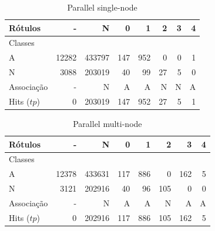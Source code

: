 


\vspace{3ex}

\begin{table}[hbt]%
{\footnotesize
\setlength\tabcolsep{0.35em}
\begin{center}
\caption{Parallel single-node}
\label{tab:single-node-matrix}
\begin{tabular}{l|r|r|r|r|r|r|r}
  Rótulos &      - &       N &    0 &    1 &   2 &  3 &  4 \\\hline
  Classes  &        &         &      &      &     &    &    \\\hline
  \hline
  A        &  12282 &  433797 &  147 &  952 &   0 &  0 &  1 \\\hline
  N        &   3088 &  203019 &   40 &   99 &  27 &  5 &  0 \\\hline
  \hline
  Associação &      - &       N &    A &    A &   N &  N &  A \\\hline
  Hits ($tp$)     &      0 &  203019 &  147 &  952 &  27 &  5 &  1 
\end{tabular}
\end{center}
}
\end{table}
% 
% 
\begin{table}[hbt]%
{\footnotesize
\setlength\tabcolsep{0.35em}
\begin{center}
\caption{Parallel multi-node}
\label{tab:multi-node-matrix}
\begin{tabular}{l|r|r|r|r|r|r|r}
  Rótulos   &      - &       N &    0 &    1 &    2 &    3 &  4 \\\hline
  Classes   &        &         &      &      &      &      &    \\\hline
  \hline
  A      &  12378 &  433631 &  117 &  886 &    0 &  162 &  5 \\\hline
  N      &   3121 &  202916 &   40 &   96 &  105 &    0 &  0 \\\hline
  \hline
  Associação   &      - &       N &    A &    A &    N &    A &  A \\\hline
  Hits ($tp$)   &      0 &  202916 &  117 &  886 &  105 &  162 &  5 
\end{tabular}
\end{center}
}
\end{table}


